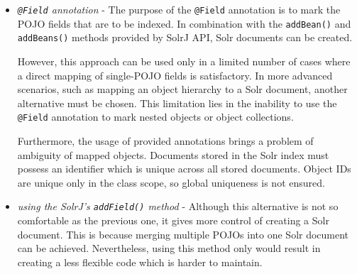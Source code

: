 \begin{itemize}
\item \textit{ \texttt{@Field} annotation} 
- The purpose of the \texttt{@Field} annotation is to mark the POJO fields that are to be indexed.
In combination with the \texttt{addBean()} and \texttt{addBeans()} methods provided by SolrJ API, Solr documents can be created.

However, this approach can be used only in a limited number of cases where a direct mapping of single-POJO fields is satisfactory.
In more advanced scenarios, such as mapping an object hierarchy to a Solr document, another alternative must be chosen. 
This limitation lies in the inability to use the \texttt{@Field} annotation to mark nested objects or object collections.

Furthermore, the usage of provided annotations brings a problem of ambiguity of mapped objects. 
Documents stored in the Solr index must possess an identifier which is unique across all stored documents. 
Object IDs are unique only in the class scope, so global uniqueness is not ensured. 


\item \textit{using the SolrJ's \texttt{addField()} method} - Although this alternative is not so comfortable as the previous one, it gives more control of creating a Solr document. 
This is because merging multiple POJOs into one Solr document can be achieved.
Nevertheless, using this method only would result in creating a less flexible code which is harder to maintain. 




\end{itemize}

